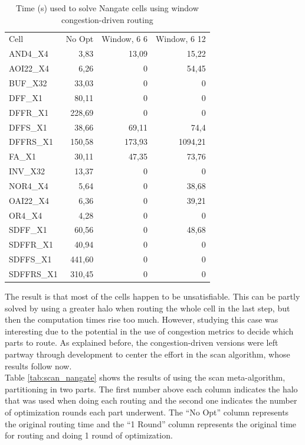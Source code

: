 \begin{table}
\centering
\begin{tabular}{|l|r|r|r|}
\cline{1-4}
Cell & No Opt & Window, 6 6 & Window, 6 12 \\ \cline{1-4}
AND4\_X4 & 3,83 & 13,09 & 15,22 \\ \hline
AOI22\_X4 & 6,26 & 0 & 54,45 \\ \hline
BUF\_X32 & 33,03 & 0 & 0  \\ \hline
DFF\_X1 & 80,11 & 0 & 0  \\ \hline
DFFR\_X1 & 228,69 & 0 & 0  \\ \hline
DFFS\_X1 & 38,66 & 69,11 & 74,4  \\ \hline
DFFRS\_X1 & 150,58 & 173,93 & 1094,21  \\ \hline
FA\_X1 & 30,11 & 47,35 & 73,76 \\ \hline
INV\_X32 & 13,37 & 0 & 0 \\ \hline
NOR4\_X4 & 5,64 & 0 & 38,68  \\ \hline
OAI22\_X4 & 6,36 & 0 & 39,21  \\ \hline
OR4\_X4 & 4,28 & 0 & 0 \\ \hline
SDFF\_X1 & 60,56 & 0 & 48,68 \\ \hline 
SDFFR\_X1 & 40,94 & 0 & 0  \\ \hline 
SDFFS\_X1 & 441,60 & 0 & 0  \\ \hline
SDFFRS\_X1 & 310,45 & 0 & 0  \\ \hline \cline{1-4}
\end{tabular} 
\caption{Time (s) used to solve Nangate cells using window congestion-driven routing}
\label{tab:window_nangate}
\end{table}

The result is that most of the cells happen to be unsatisfiable. This can be partly solved by using a greater halo when routing the whole cell in the last step, but then the computation times rise too much. However, studying this case was interesting due to the potential in the use of congestion metrics to decide which parts to route. As explained before, the congestion-driven versions were left partway through development to center the effort in the scan algorithm, whose results follow now. \\

Table \ref{tab:scan_nangate} shows the results of using the scan meta-algorithm, partitioning in two parts. The first number above each column indicates the halo that was used when doing each routing and the second one indicates the number of optimization rounds each part underwent. The ``No Opt'' column represents the original routing time and the ``1 Round'' column represents the original time for routing and doing 1 round of optimization. \\

